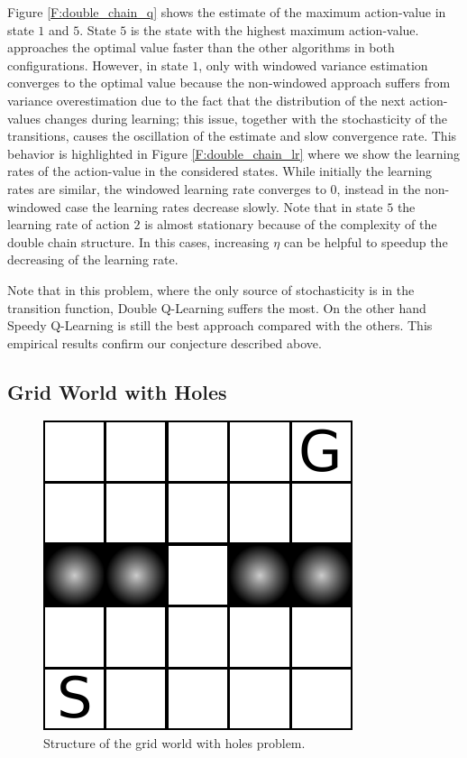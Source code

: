 \documentclass[conference]{IEEEtran}
\begin{document}
Figure \ref{F:double_chain_q} shows the estimate of the maximum action-value in state $1$ and $5$. State $5$ is the state with the highest maximum action-value. \alg approaches the optimal value faster than the other algorithms in both configurations. However, in state $1$, only \alg with windowed variance estimation converges to the optimal value because the non-windowed approach suffers from variance overestimation due to the fact that the distribution of the next action-values changes during learning; this issue, together with the stochasticity of the transitions, causes the oscillation of the estimate and slow convergence rate. This behavior is highlighted in Figure \ref{F:double_chain_lr} where we show the learning rates of the action-value in the considered states. While initially the learning rates are similar, the windowed learning rate converges to $0$, instead in the non-windowed case the learning rates decrease slowly. Note that in state $5$ the learning rate of action $2$ is almost stationary because of the complexity of the double chain structure. In this cases, increasing $\eta$ can be helpful to speedup the decreasing of the learning rate.

Note that in this problem, where the only source of stochasticity is in the transition function, Double Q-Learning suffers the most. On the other hand Speedy Q-Learning is still the best approach compared with the others. This empirical results confirm our conjecture described above.

\subsection{Grid World with Holes}
\begin{figure}[t]
\centering
\includegraphics[scale=.75]{./imgs/gridHole/gridhole.pdf}
\caption{Structure of the grid world with holes problem.}
  \label{F:grid_hole}
\end{figure}
\end{document}

